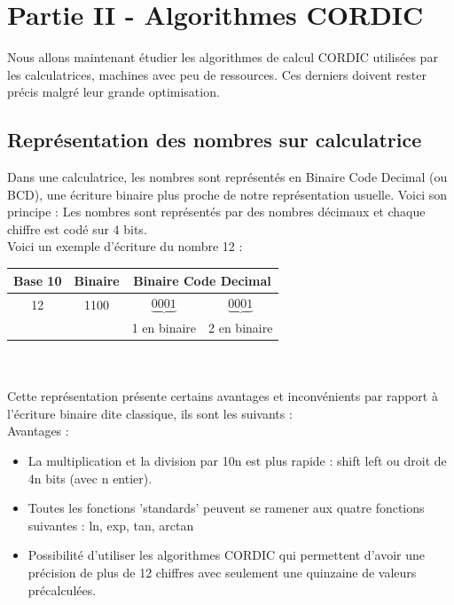\documentclass{article}
\begin{document}
\section*{Partie II - Algorithmes CORDIC}

Nous allons maintenant étudier les algorithmes de calcul CORDIC utilisées par les calculatrices, machines avec peu de ressources. Ces derniers doivent rester précis malgré leur grande optimisation.

\subsection*{Représentation des nombres sur calculatrice}

Dans une calculatrice, les nombres sont représentés en Binaire Code Decimal (ou BCD), une écriture binaire plus proche de notre représentation usuelle. Voici son principe : Les nombres sont représentés par des nombres décimaux et chaque chiffre est codé sur 4 bits. \\

Voici un exemple d'écriture du nombre 12 : \\

\begin{tabular}{ c | c | c c }
    \label{exemple_de_representation_pour_12}
   Base 10 & Binaire &   \multicolumn{2}{c}{Binaire Code Decimal}\\ \hline
    12 & 1100 & $\underbrace{0001}$ & $\underbrace{0001}$ \\
    & & 1 en binaire & 2 en binaire \\
 \end{tabular} \\ \\ 

Cette représentation présente certains avantages et inconvénients par rapport à l'écriture binaire dite classique, ils sont les suivants : \\

Avantages :
\begin{itemize}
    \item La multiplication et la division par 10n est plus rapide : shift left ou droit de 4n bits (avec n entier).
    \item Toutes les fonctions 'standards' peuvent se ramener aux quatre fonctions suivantes :  ln, exp, tan, arctan
    \item Possibilité d'utiliser les algorithmes CORDIC qui permettent d'avoir une précision de plus de 12 chiffres avec seulement une quinzaine de valeurs précalculées.
\end{itemize}
\end{document}
